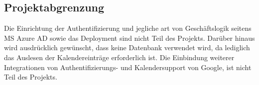 \subsection{Projektabgrenzung} 
\label{sec:Projektabgrenzung}
Die Einrichtung der Authentifizierung und jegliche art von Geschäftslogik seitens \ac{MS} Azure \ac{AD} sowie das Deployment sind nicht Teil des Projekts.
Darüber hinaus wird ausdrücklich gewünscht, dass keine Datenbank verwendet wird, da lediglich das Auslesen der Kalendereinträge erforderlich ist.
Die Einbindung weiterer Integrationen von Authentifizierungs- und Kalendersupport von \zB Google, ist nicht Teil des Projekts.